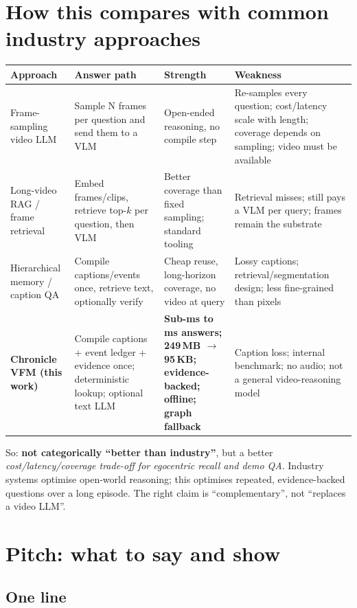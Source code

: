 \documentclass[10pt,a4paper]{article}
\begin{document}
\section{How this compares with common industry approaches}

\begin{center}
\small
\begin{tabularx}{\linewidth}{@{}p{2.25cm} X X X@{}}
\toprule
\textbf{Approach} & \textbf{Answer path} & \textbf{Strength} & \textbf{Weakness} \\
\midrule
Frame-sampling video LLM & Sample N frames per question and send them to a VLM & Open-ended reasoning, no compile step & Re-samples every question; cost/latency scale with length; coverage depends on sampling; video must be available \\
Long-video RAG / frame retrieval & Embed frames/clips, retrieve top-$k$ per question, then VLM & Better coverage than fixed sampling; standard tooling & Retrieval misses; still pays a VLM per query; frames remain the substrate \\
Hierarchical memory / caption QA & Compile captions/events once, retrieve text, optionally verify & Cheap reuse, long-horizon coverage, no video at query & Lossy captions; retrieval/segmentation design; less fine-grained than pixels \\
\textbf{Chronicle VFM (this work)} & Compile captions + event ledger + evidence once; deterministic lookup; optional text LLM & \textbf{Sub-ms to ms answers; 249\,MB $\rightarrow$ 95\,KB; evidence-backed; offline; graph fallback} & Caption loss; internal benchmark; no audio; not a general video-reasoning model \\
\bottomrule
\end{tabularx}
\end{center}

\noindent
So: \textbf{not categorically “better than industry”}, but a better \emph{cost/latency/coverage trade-off for egocentric recall and demo QA}. Industry systems optimise open-world reasoning; this optimises repeated, evidence-backed questions over a long episode. The right claim is “complementary”, not “replaces a video LLM”.

\section{Pitch: what to say and show}

\subsection*{One line}
\end{document}
